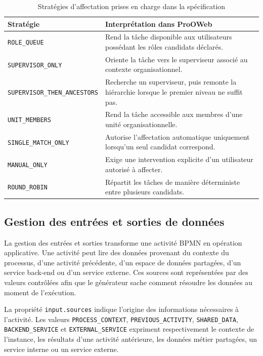 \begin{table}[H]
\centering
\small
\caption{Stratégies d'affectation prises en charge dans la spécification}
\label{tab:chap3-strategies-affectation}
\begin{tabular}{p{4.4cm}p{9.5cm}}
\hline
\textbf{Stratégie} & \textbf{Interprétation dans ProOWeb} \\
\hline
\texttt{ROLE\_QUEUE} & Rend la tâche disponible aux utilisateurs possédant les rôles candidats déclarés. \\
\texttt{SUPERVISOR\_ONLY} & Oriente la tâche vers le superviseur associé au contexte organisationnel. \\
\texttt{SUPERVISOR\_THEN\_ANCESTORS} & Recherche un superviseur, puis remonte la hiérarchie lorsque le premier niveau ne suffit pas. \\
\texttt{UNIT\_MEMBERS} & Rend la tâche accessible aux membres d'une unité organisationnelle. \\
\texttt{SINGLE\_MATCH\_ONLY} & Autorise l'affectation automatique uniquement lorsqu'un seul candidat correspond. \\
\texttt{MANUAL\_ONLY} & Exige une intervention explicite d'un utilisateur autorisé à affecter. \\
\texttt{ROUND\_ROBIN} & Répartit les tâches de manière déterministe entre plusieurs candidats. \\
\hline
\end{tabular}
\end{table}

\subsection{Gestion des entrées et sorties de données}

La gestion des entrées et sorties transforme une activité BPMN en opération applicative. Une activité peut lire des données provenant du contexte du processus, d'une activité précédente, d'un espace de données partagées, d'un service back-end ou d'un service externe. Ces sources sont représentées par des valeurs contrôlées afin que le générateur sache comment résoudre les données au moment de l'exécution.

La propriété \texttt{input.sources} indique l'origine des informations nécessaires à l'activité. Les valeurs \texttt{PROCESS\_CONTEXT}, \texttt{PREVIOUS\_ACTIVITY}, \texttt{SHARED\_DATA}, \texttt{BACKEND\_SERVICE} et \texttt{EXTERNAL\_SERVICE} expriment respectivement le contexte de l'instance, les résultats d'une activité antérieure, les données métier partagées, un service interne ou un service externe.

